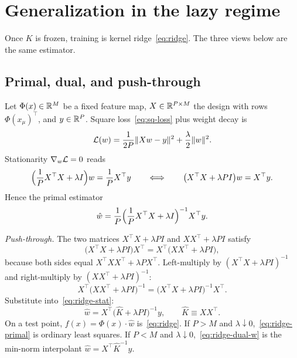 \section{Generalization in the lazy regime}
\label{sec:gen}

Once $K$ is frozen, training is kernel ridge~\eqref{eq:ridge}. The three views below are the same estimator.

\subsection{Primal, dual, and push-through}

Let $\Phi(x)\in\mathbb{R}^{M}$ be a fixed feature map, $X\in\mathbb{R}^{P\times M}$ the design with rows $\Phi(x_\mu)^\top$, and $y\in\mathbb{R}^{P}$. Square loss~\eqref{eq:sq-loss} plus weight decay is
\begin{equation}
  \mathcal{L}(w)
  =\frac1{2P}\|Xw-y\|^2+\frac\lambda2\|w\|^2.
  \label{eq:ridge-loss}
\end{equation}
Stationarity $\nabla_w\mathcal{L}=0$ reads
\begin{equation}
  \Bigl(\frac1P X^\top X+\lambda I\Bigr)w
  =\frac1P X^\top y
  \qquad\Longleftrightarrow\qquad
  \bigl(X^\top X+\lambda P I\bigr)w
  =X^\top y.
  \label{eq:ridge-stat}
\end{equation}
Hence the primal estimator
\begin{equation}
  \hat w
  =\frac1P\Bigl(\frac1P X^\top X+\lambda I\Bigr)^{-1} X^\top y.
  \label{eq:ridge-primal}
\end{equation}

\emph{Push-through.} The two matrices $X^\top X+\lambda P I$ and $XX^\top+\lambda P I$ satisfy
\begin{equation}
  \bigl(X^\top X+\lambda P I\bigr)X^\top
  =X^\top\bigl(XX^\top+\lambda P I\bigr),
  \label{eq:push-pre}
\end{equation}
because both sides equal $X^\top XX^\top+\lambda P X^\top$. Left-multiply by $(X^\top X+\lambda P I)^{-1}$ and right-multiply by $(XX^\top+\lambda P I)^{-1}$:
\begin{equation}
  X^\top\bigl(XX^\top+\lambda P I\bigr)^{-1}
  =\bigl(X^\top X+\lambda P I\bigr)^{-1}X^\top.
  \label{eq:push}
\end{equation}
Substitute into~\eqref{eq:ridge-stat}:
\begin{equation}
  \hat w
  =X^\top\bigl(\hat K+\lambda P I\bigr)^{-1} y,
  \qquad
  \hat K\equiv XX^\top.
  \label{eq:ridge-dual-w}
\end{equation}
On a test point, $f(x)=\Phi(x)\cdot\hat w$ is~\eqref{eq:ridge}. If $P>M$ and $\lambda\downarrow 0$,~\eqref{eq:ridge-primal} is ordinary least squares. If $P<M$ and $\lambda\downarrow 0$,~\eqref{eq:ridge-dual-w} is the min-norm interpolant $\hat w=X^\top\hat K^{-1} y$.


